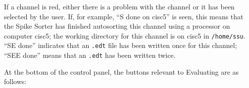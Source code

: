 \documentclass[12pt]{article}
\begin{document}
\begin{center}
  \label{running}
\end{center}
If a channel is red, either there is a problem with the channel or it
has been selected by the user. If, for example, ``S done on cisc5'' is
seen, this means that the Spike Sorter has finished autosorting this
channel using a processor on computer cisc5; the working directory for
this channel is on cisc5 in {\tt /home/ssu}. ``SE done'' indicates
that an {\tt *.edt} file has been written once for this channel; ``SEE
done'' means that an {\tt *.edt} has been written twice.

At the bottom of the control panel, the buttons relevant to Evaluating
are as follows:
\end{document}
